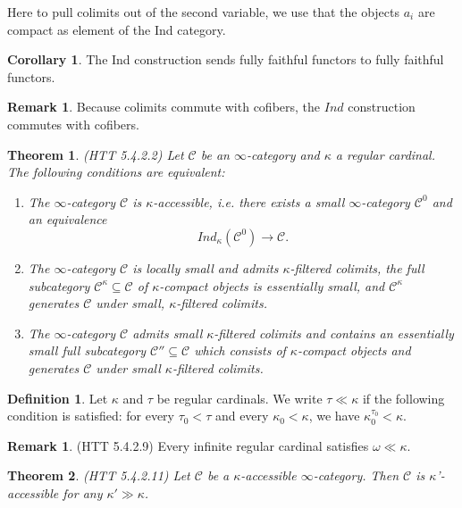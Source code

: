 \documentclass[letterpaper]{article}
\newtheorem{theorem}{Theorem}
\theoremstyle{definition}
\newtheorem{corollary}[lemma]{Corollary}
\newtheorem{definition}[lemma]{Definition}
\newtheorem{remark}[lemma]{Remark}
\newcommand{\mc}{\mathcal}
\begin{document}
Here to pull colimits out of the second variable, we use that the
objects $a_i$ are compact as element of the Ind category. 

\begin{corollary}
The Ind construction sends fully faithful functors to fully faithful functors.
\end{corollary}

\begin{remark}
Because colimits commute with cofibers, the $Ind$ construction
commutes with cofibers.
\end{remark}



\begin{theorem} (HTT 5.4.2.2)
Let $\mc C$ be an $\infty$-category and $\kappa$ a regular
cardinal. The following conditions are equivalent:

\begin{enumerate}
\item The $\infty$-category $\mc C$ is $\kappa$-accessible, i.e. there
  exists a small $\infty$-category $\mc C^{0}$ and an equivalence 
\[
Ind_{\kappa}(\mc C^0) \rightarrow \mc C.
\]
\item The $\infty$-category $\mc C$ is locally small and admits
  $\kappa$-filtered colimits, the full subcategory $\mc C^{\kappa}
  \subseteq \mc C$ of $\kappa$-compact objects is essentially small,
  and $\mc C^\kappa$ generates $\mc C$ under small, $\kappa$-filtered
  colimits.
\item The $\infty$-category $\mc C$ admits small $\kappa$-filtered
  colimits and contains an essentially small full subcategory $\mc C''
  \subseteq \mc C$ which consists of $\kappa$-compact objects and
  generates $\mc C$ under small $\kappa$-filtered colimits.
\end{enumerate}
\end{theorem}

\begin{definition}
Let $\kappa$ and $\tau$ be regular cardinals. We write $\tau \ll
\kappa$ if the following condition is satisfied: for every $\tau_0 <
\tau$ and every $\kappa_0 < \kappa$, we have $\kappa_0^{\tau_0} < \kappa$.
\end{definition}

\begin{remark} (HTT 5.4.2.9)
Every infinite regular cardinal satisfies $\omega \ll \kappa$.
\end{remark}

\begin{theorem} (HTT 5.4.2.11)
Let $\mc C$ be  a $\kappa$-accessible $\infty$-category. Then $\mc C$
is $\kappa$'-accessible for any $\kappa' \gg \kappa$.
\end{theorem}
\end{document}
